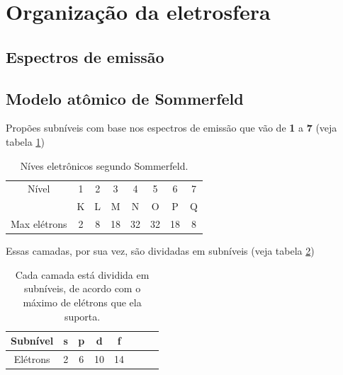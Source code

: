 \documentclass{article}
\begin{document}
\section{Organização da eletrosfera}
\subsection{Espectros de emissão}
\subsection{Modelo atômico de Sommerfeld} \label{modelo:sommerfeld}
Propões subníveis com base nos espectros de emissão que vão de \textbf{1} a \textbf{7} (veja tabela \ref{tabela:modelo_sommerfeld})
\begin{table}[h!]
    \centering
    \begin{tabular}{||c||c|c|c|c|c|c|c||}
        \hline
        \hline

        Nível & 1 & 2 & 3 & 4 & 5 & 6 & 7 \\
        & K & L & M & N & O & P & Q \\
        \hline

        Max elétrons & 2 & 8 & 18 & 32 & 32 & 18 & 8 \\
        \hline

        \hline
        \hline
    \end{tabular}

    \caption{Níves eletrônicos segundo Sommerfeld.}
    \label{tabela:modelo_sommerfeld}
\end{table}

Essas camadas, por sua vez, são dividadas em subníveis (veja tabela \ref{tabela:modelo_sommerfeld:subniveis})

\begin{table}[h!]
    \centering
    \begin{tabular}{||c||c|c|c|c|c|c|c||}
        \hline
        \hline

        Subnível & s & p & d & f \\
        \hline

        Elétrons & 2 & 6 & 10 & 14 \\
        \hline

        \hline
        \hline
    \end{tabular}

    \caption{Cada camada está dividida em subníveis, de acordo com o máximo de elétrons que ela suporta.}
    \label{tabela:modelo_sommerfeld:subniveis}
\end{table}
\end{document}

